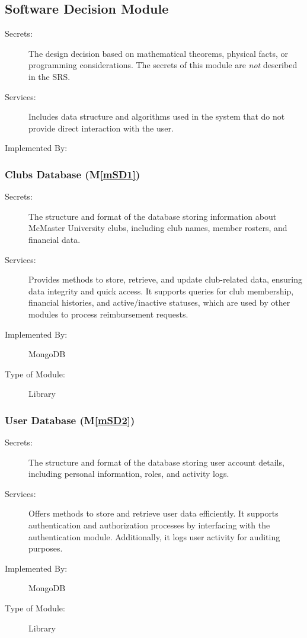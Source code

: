 \documentclass[12pt, titlepage]{article}
\newcommand{\mref}[1]{M\ref{#1}}
\begin{document}
\subsection{Software Decision Module}

\begin{description}
\item[Secrets:] The design decision based on mathematical theorems, physical
  facts, or programming considerations. The secrets of this module are
  \emph{not} described in the SRS.
\item[Services:] Includes data structure and algorithms used in the system that
  do not provide direct interaction with the user. 
\item[Implemented By:]
\end{description}

\subsubsection{Clubs Database (\mref{mSD1})}

\begin{description}
\item[Secrets:] The structure and format of the database storing information about McMaster University clubs, including club names, member rosters, and financial data.
\item[Services:] Provides methods to store, retrieve, and update club-related data, ensuring data integrity and quick access. It supports queries for club membership, financial histories, and active/inactive statuses, which are used by other modules to process reimbursement requests.
\item[Implemented By:] MongoDB
\item[Type of Module:] Library
\end{description}

\subsubsection{User Database (\mref{mSD2})}

\begin{description}
\item[Secrets:] The structure and format of the database storing user account details, including personal information, roles, and activity logs.
\item[Services:] Offers methods to store and retrieve user data efficiently. It supports authentication and authorization processes by interfacing with the authentication module. Additionally, it logs user activity for auditing purposes.
\item[Implemented By:] MongoDB
\item[Type of Module:] Library
\end{description}
\end{document}
